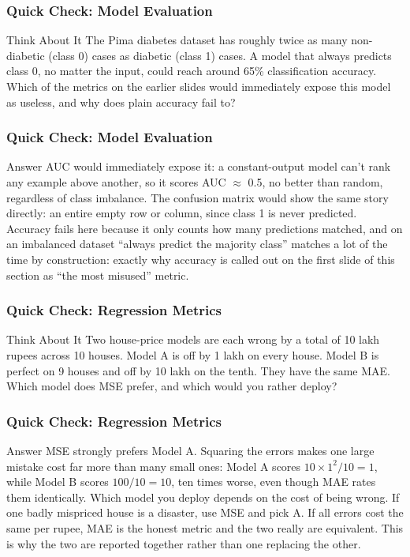 \begin{frame}[fragile]\frametitle{Quick Check: Model Evaluation}
\begin{block}{Think About It}
The Pima diabetes dataset has roughly twice as many non-diabetic (class 0) cases as diabetic (class 1) cases. A model that always predicts class 0, no matter the input, could reach around 65\% classification accuracy. Which of the metrics on the earlier slides would immediately expose this model as useless, and why does plain accuracy fail to?
\end{block}
\end{frame}

\begin{frame}[fragile]\frametitle{Quick Check: Model Evaluation}
\begin{block}{Answer}
AUC would immediately expose it: a constant-output model can't rank any example above another, so it scores AUC $\approx$ 0.5, no better than random, regardless of class imbalance. The confusion matrix would show the same story directly: an entire empty row or column, since class 1 is never predicted. Accuracy fails here because it only counts how many predictions matched, and on an imbalanced dataset ``always predict the majority class'' matches a lot of the time by construction: exactly why accuracy is called out on the first slide of this section as ``the most misused'' metric.
\end{block}
\end{frame}

\begin{frame}[fragile]\frametitle{Quick Check: Regression Metrics}
\begin{block}{Think About It}
Two house-price models are each wrong by a total of 10 lakh rupees across 10 houses. Model A is off by 1 lakh on every house. Model B is perfect on 9 houses and off by 10 lakh on the tenth. They have the same MAE. Which model does MSE prefer, and which would you rather deploy?
\end{block}
\end{frame}

\begin{frame}[fragile]\frametitle{Quick Check: Regression Metrics}
\begin{block}{Answer}
MSE strongly prefers Model A. Squaring the errors makes one large mistake cost far more than many small ones: Model A scores $10 \times 1^2 / 10 = 1$, while Model B scores $100 / 10 = 10$, ten times worse, even though MAE rates them identically. Which model you deploy depends on the cost of being wrong. If one badly mispriced house is a disaster, use MSE and pick A. If all errors cost the same per rupee, MAE is the honest metric and the two really are equivalent. This is why the two are reported together rather than one replacing the other.
\end{block}
\end{frame}


